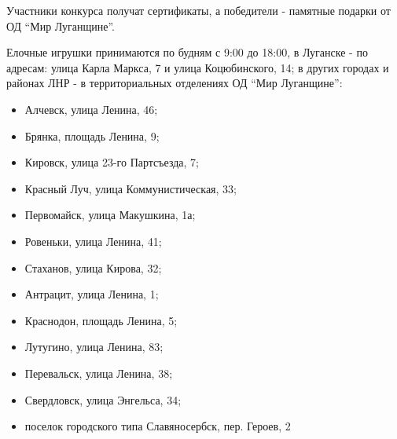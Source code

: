 Участники конкурса получат сертификаты, а победители - памятные подарки от ОД
\enquote{Мир Луганщине}.

Елочные игрушки принимаются по будням с 9:00 до 18:00, в Луганске - по адресам:
улица Карла Маркса, 7 и улица Коцюбинского, 14; в других городах и районах ЛНР
- в территориальных отделениях ОД \enquote{Мир Луганщине}: 

\begin{itemize}
  \item Алчевск, улица Ленина, 46;
  \item Брянка, площадь Ленина, 9;
  \item Кировск, улица 23-го Партсъезда, 7;
  \item Красный Луч, улица Коммунистическая, 33;
  \item Первомайск, улица Макушкина, 1а;
  \item Ровеньки, улица Ленина, 41;
  \item Стаханов, улица Кирова, 32;
  \item Антрацит, улица Ленина, 1;
  \item Краснодон, площадь Ленина, 5;
  \item Лутугино, улица Ленина, 83;
  \item Перевальск, улица Ленина, 38;
  \item Свердловск, улица Энгельса, 34;
  \item поселок городского типа Славяносербск, пер. Героев, 2
\end{itemize}
